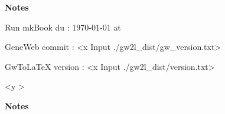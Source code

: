 \printindex
\newpage
{\huge {\bf Notes}}
\par
Run mkBook du : {\ddmmyyyydate\today} at \currenttime

GeneWeb commit : 
<x Input ./gw2l_dist/gw_version.txt>
\par
GwTo\LaTeX{} version : 
<x Input ./gw2l_dist/version.txt>
\par
<y \hgbaseversion{}>
\par
\pdftexbanner{}
\newpage
{\huge {\bf Notes}}
